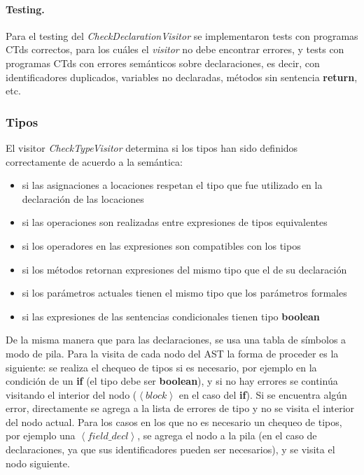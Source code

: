 \documentclass[11pt,a4paper]{article}
\begin{document}
\paragraph{Testing.} Para el testing del \textit{CheckDeclarationVisitor} se implementaron tests con programas CTds correctos, para los cuáles el \textit{visitor} no debe encontrar errores, y tests con programas CTds con errores semánticos sobre declaraciones, es decir, con identificadores duplicados, variables no declaradas, métodos sin sentencia \textbf{return}, etc.


\subsubsection{Tipos}
\label{subsec:tipos}

El visitor \textit{CheckTypeVisitor} determina si los tipos han sido definidos correctamente de acuerdo a la semántica: 
\begin{itemize}
	\item si las asignaciones a locaciones respetan el tipo que fue utilizado en la declaración de las locaciones
	\item si las operaciones son realizadas entre expresiones de tipos equivalentes
	\item si los operadores en las expresiones son compatibles con los tipos
	\item si los métodos retornan expresiones del mismo tipo que el de su declaración
	\item si los parámetros actuales tienen el mismo tipo que los parámetros formales
	\item si las expresiones de las sentencias condicionales tienen tipo \textbf{boolean}
\end{itemize}

De la misma manera que para las declaraciones, se usa una tabla de símbolos a modo de pila. Para la visita de cada nodo del AST la forma de proceder es la siguiente: se realiza el chequeo de tipos si es necesario, por ejemplo en la condición de un \textbf{if} (el tipo debe ser \textbf{boolean}), y si no hay errores se continúa visitando el interior del nodo ($\left\langle block \right\rangle$ en el caso del \textbf{if}). Si se encuentra algún error, directamente se agrega a la lista de errores de tipo y no se visita el interior del nodo actual. Para los casos en los que no es necesario un chequeo de tipos, por ejemplo una  $\left\langle field\_decl \right\rangle$, se agrega el nodo a la pila (en el caso de declaraciones, ya que sus identificadores pueden ser necesarios), y se visita el nodo siguiente.
\end{document}
